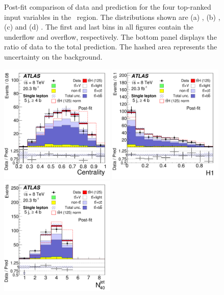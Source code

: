 \begin{figure}[tp]
\begin{center}
\caption{Post-fit comparison of data and prediction for the four top-ranked input variables in the 
\fivethree\ region. The distributions shown are (a) \mbbmaxpt, (b) \whadmass, (c)  \whadpt and (d) \mbbmindr.
The first and last bins in all figures contain the underflow and 
overflow, respectively. The bottom panel displays the ratio of 
data to the total prediction. The hashed area represents the uncertainty on the background. }
\label{fig:postinput_lj_0} 
\end{center}
\end{figure}

\begin{figure}[tp]
\begin{center}
\includegraphics[width=0.49\textwidth]{Appendices/Figures_separation/cent_5.pdf}
\includegraphics[width=0.49\textwidth]{Appendices/Figures_separation/H1_5.pdf}\\
\includegraphics[width=0.49\textwidth]{Appendices/Figures_separation/num_jet_40_5.pdf}

\end{center}
\end{figure}
